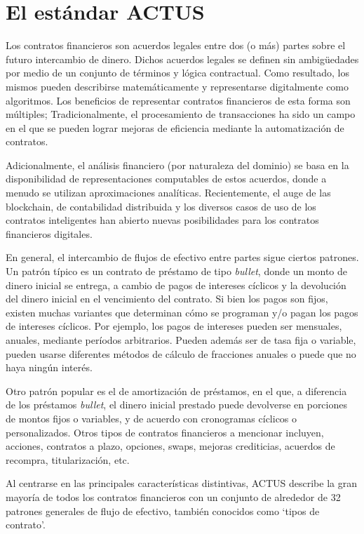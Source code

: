 \documentclass[12pt]{book}
\begin{document}
\section{El estándar ACTUS}
Los contratos financieros son acuerdos legales entre dos (o más) partes sobre el futuro intercambio de dinero. Dichos acuerdos legales se definen sin ambigüedades por medio de un conjunto de términos y lógica contractual. Como resultado, los mismos pueden describirse matemáticamente y representarse digitalmente como algoritmos. Los beneficios de representar contratos financieros de esta forma son múltiples; Tradicionalmente, el procesamiento de transacciones ha sido un campo en el que se pueden lograr mejoras de eficiencia mediante la automatización de contratos.

Adicionalmente, el análisis financiero (por naturaleza del dominio) se basa en la disponibilidad de representaciones computables de estos acuerdos, donde a menudo se utilizan aproximaciones analíticas. Recientemente, el auge de las blockchain, de contabilidad distribuida y los diversos casos de uso de los contratos inteligentes han abierto nuevas posibilidades para los contratos financieros digitales.

En general, el intercambio de flujos de efectivo entre partes sigue ciertos patrones. Un patrón típico es un contrato de préstamo de tipo \textit{bullet}, donde un monto de dinero inicial se entrega, a cambio de pagos de intereses cíclicos y la devolución del dinero inicial en el vencimiento del contrato. Si bien los pagos son fijos, existen muchas variantes que determinan cómo se programan y/o pagan los pagos de intereses cíclicos. Por ejemplo, los pagos de intereses pueden ser mensuales, anuales, mediante períodos arbitrarios. Pueden además ser de tasa fija o variable, pueden usarse diferentes métodos de cálculo de fracciones anuales o puede que no haya ningún interés.

Otro patrón popular es el de amortización de préstamos, en el que, a diferencia de los préstamos \textit{bullet}, el dinero inicial prestado puede devolverse en porciones de montos fijos o variables, y de acuerdo con cronogramas cíclicos o personalizados. Otros tipos de contratos financieros a mencionar incluyen, acciones, contratos a plazo, opciones, swaps, mejoras crediticias, acuerdos de recompra, titularización, etc.

Al centrarse en las principales características distintivas, ACTUS describe la gran mayoría de todos los contratos financieros con un conjunto de alrededor de 32 patrones generales de flujo de efectivo, también conocidos como `tipos de contrato'.
\end{document}
